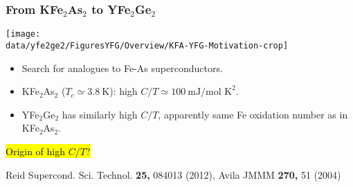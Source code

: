 
%
%
%
\begin{frame}[label=KFA-YFG-Motivation]
\frametitle{From KFe$_2$As$_2$ to YFe$_2$Ge$_2$}
\centerline{\texttt{[image: \\data/yfe2ge2/FiguresYFG/Overview/KFA-YFG-Motivation-crop]}}

\vspace{2em}

\begin{itemize}
\item
Search for analogues to Fe-As superconductors.

\item
KFe$_2$As$_2$ ($T_c \simeq 3.8 ~\text{K}$): high $C/T \simeq 100
~\text{mJ/mol K}^{2}$.

\item
YFe$_2$Ge$_2$ has similarly high $C/T$, apparently same Fe oxidation
number as in
KFe$_2$As$_2$.
\end{itemize}
\centerline{\hl{Origin of high $C/T$?}}

\vspace*{\fill}
\centerline{\makebox[\linewidth]{\rule{0.85\textwidth}{0.4pt}}}
\centerline{\scriptsize Reid Supercond. Sci. Technol. {\bf 25,} 084013 (2012), Avila JMMM {\bf 270,} 51 (2004)}
\end{frame}



